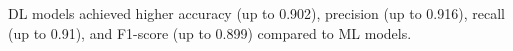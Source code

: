 DL models achieved higher accuracy (up to 0.902), precision (up to 0.916), recall (up to 0.91), and F1-score (up to 0.899) compared to ML models.